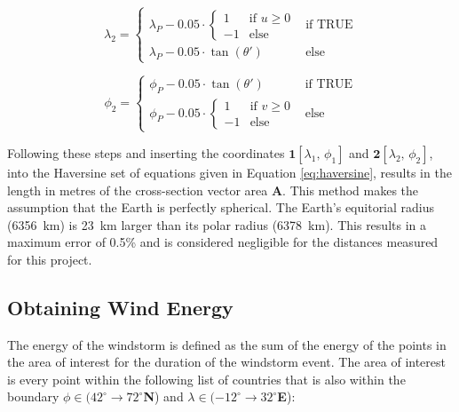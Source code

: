         
        \begin{equation} \label{eq:lon2_transform}
            \lambda_2 =
            \begin{cases} 
                \lambda_P - 0.05\cdot
                    \begin{cases}
                        1  & \text{if } u \geq 0 \\
                        -1 & \text{else}
                    \end{cases}
                    & \text{if } \text{TRUE} \\
                \lambda_P - 0.05 \cdot \tan(\theta') & \text{else}
            \end{cases}
        \end{equation}
        
        
        \begin{equation} \label{eq:lat2_transform}
            \phi_2 =
            \begin{cases} 
                \phi_P - 0.05 \cdot \tan(\theta') & \text{if } \text{TRUE} \\
                \phi_P - 0.05\cdot
                    \begin{cases}
                        1  & \text{if } v \geq 0 \\
                        -1 & \text{else}
                    \end{cases}
                    & \text{else}
            \end{cases}
        \end{equation}

        Following these steps and inserting the coordinates $\mathbf{1}\left[\lambda_1,\, \phi_1\right]$ and $\mathbf{2}\left[\lambda_2,\, \phi_2\right]$, into the Haversine set of equations given in Equation \ref{eq:haversine}, results in the length in metres of the cross-section vector area $\mathbf{A}$. This method makes the assumption that the Earth is perfectly spherical. The Earth's equitorial radius (6356~km) is 23~km larger than its polar radius (6378~km). This results in a maximum error of 0.5\% and is considered negligible for the distances measured for this project.
        
    \subsection{Obtaining Wind Energy}

        The energy of the windstorm is defined as the sum of the energy of the points in the area of interest for the duration of the windstorm event. The area of interest is every point within the following list of countries that is also within the boundary $\phi \in (42^\circ \rightarrow 72^\circ$\textbf{N}) and $\lambda \in (-12^\circ \rightarrow 32^\circ$\textbf{E}):

